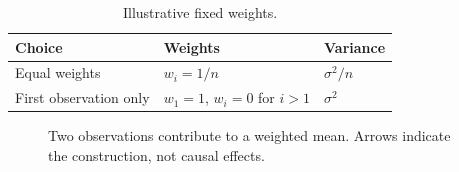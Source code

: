\begin{table}[!htbp]
\centering
\caption{Illustrative fixed weights.}
\label{SI-tab:weights}
\begin{tabularx}{\linewidth}{@{}Xll@{}}
\toprule
Choice & Weights & Variance \\
\midrule
Equal weights & $w_i=1/n$ & $\sigma^2/n$ \\
First observation only & $w_1=1$, $w_i=0$ for $i>1$ & $\sigma^2$ \\
\bottomrule
\end{tabularx}
\end{table}

\begin{figure}[!htbp]
\centering

\caption{Two observations contribute to a weighted mean. Arrows indicate the construction, not causal effects.}
\label{SI-fig:weights}
\end{figure}

\FloatBarrier
